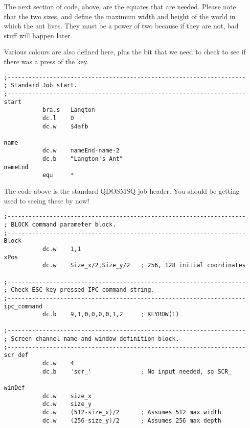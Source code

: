 The next section of code, above, are the equates that are needed. Please note that the two sizes,  and  define the maximum width and height of the world in which the ant lives. They must be a power of two because if they are not, bad stuff will happen later. 

Various colours are also defined here, plus the bit that we need to check to see if there was a press of the  key.

\begin{lstlisting}[firstnumber=last,caption={Langtons Ant - Job Header}]
;--------------------------------------------------------------------
; Standard Job start.
;--------------------------------------------------------------------
start
           bra.s   Langton
           dc.l    0
           dc.w    $4afb

name
           dc.w    nameEnd-name-2
           dc.b    "Langton's Ant"
nameEnd
           equ     *

\end{lstlisting}

The code above is the standard QDOSMSQ job header. You should be getting used to seeing these by now!

\begin{lstlisting}[firstnumber=last,caption={Langtons Ant - Command and Channel Definitions}]
;--------------------------------------------------------------------
; BLOCK command parameter block.
;--------------------------------------------------------------------
Block
           dc.w    1,1
xPos
           dc.w    Size_x/2,Size_y/2   ; 256, 128 initial coordinates

;--------------------------------------------------------------------
; Check ESC key pressed IPC command string.
;--------------------------------------------------------------------
ipc_command
           dc.b    9,1,0,0,0,0,1,2     ; KEYROW(1)

;--------------------------------------------------------------------
; Screen channel name and window definition block.
;--------------------------------------------------------------------
scr_def
           dc.w    4
           dc.b    'scr_'              ; No input needed, so SCR_

winDef
           dc.w    size_x
           dc.w    size_y
           dc.w    (512-size_x)/2      ; Assumes 512 max width
           dc.w    (256-size_y)/2      ; Assumes 256 max depth

\end{lstlisting}


